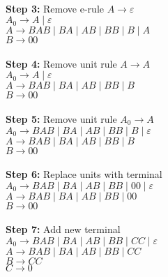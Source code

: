 \documentclass{article}
\begin{document}
\begin{itemize}
    \\
    \textbf{Step 3:} Remove e-rule $A \to \varepsilon$ \\
    $A_{0} \to A \mid \varepsilon$ \\
    $A \to BAB \mid BA \mid AB \mid BB \mid B \mid A$ \\
    $B \to 00$ \\
    \\
    \textbf{Step 4:} Remove unit rule $A \to A$ \\
    $A_{0} \to A \mid \varepsilon$ \\
    $A \to BAB \mid BA \mid AB \mid BB \mid B$ \\
    $B \to 00$ \\
    \\
    \textbf{Step 5:} Remove unit rule $A_{0} \to A$ \\
    $A_{0} \to BAB \mid BA \mid AB \mid BB \mid B \mid \varepsilon$ \\
    $A \to BAB \mid BA \mid AB \mid BB \mid B$ \\
    $B \to 00$ \\
    \\
    \textbf{Step 6:} Replace units with terminal\\
    $A_{0} \to BAB \mid BA \mid AB \mid BB \mid 00 \mid \varepsilon$ \\
    $A \to BAB \mid BA \mid AB \mid BB \mid 00$ \\
    $B \to 00$ \\
    \\
    \textbf{Step 7:} Add new terminal \\
    $A_{0} \to BAB \mid BA \mid AB \mid BB \mid CC \mid \varepsilon$ \\
    $A \to BAB \mid BA \mid AB \mid BB \mid CC$ \\
    $B \to CC$ \\
    $C \to 0$ \\
\end{itemize}
\end{document}
